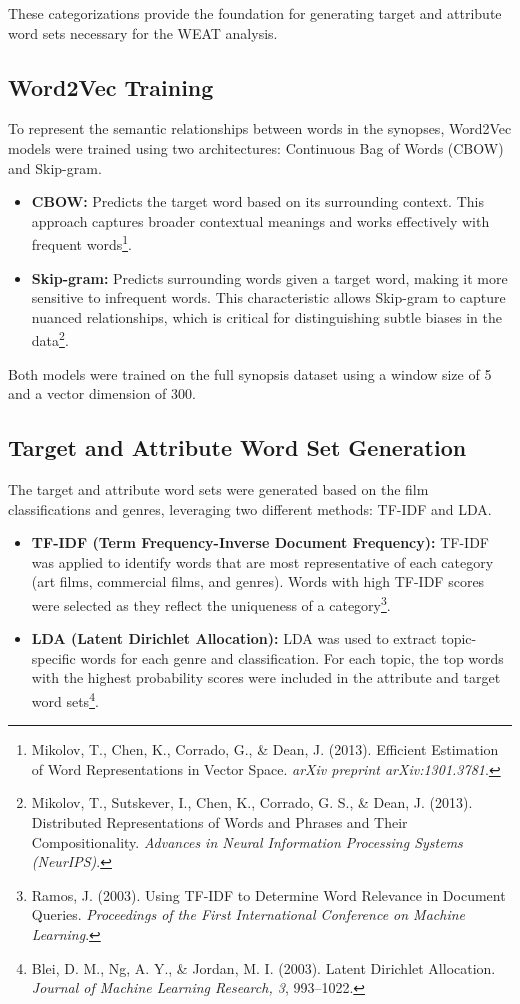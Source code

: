 \documentclass[conference]{IEEEtran}
\begin{document}
These categorizations provide the foundation for generating target and attribute word sets necessary for the WEAT analysis.

\subsection{Word2Vec Training}
To represent the semantic relationships between words in the synopses, Word2Vec models were trained using two architectures: Continuous Bag of Words (CBOW) and Skip-gram.

\begin{itemize}
    \item \textbf{CBOW:} Predicts the target word based on its surrounding context. This approach captures broader contextual meanings and works effectively with frequent words\footnote{Mikolov, T., Chen, K., Corrado, G., \& Dean, J. (2013). Efficient Estimation of Word Representations in Vector Space. \textit{arXiv preprint arXiv:1301.3781}.}.
    \item \textbf{Skip-gram:} Predicts surrounding words given a target word, making it more sensitive to infrequent words. This characteristic allows Skip-gram to capture nuanced relationships, which is critical for distinguishing subtle biases in the data\footnote{Mikolov, T., Sutskever, I., Chen, K., Corrado, G. S., \& Dean, J. (2013). Distributed Representations of Words and Phrases and Their Compositionality. \textit{Advances in Neural Information Processing Systems (NeurIPS)}.}.
\end{itemize}

Both models were trained on the full synopsis dataset using a window size of 5 and a vector dimension of 300.

\subsection{Target and Attribute Word Set Generation}
The target and attribute word sets were generated based on the film classifications and genres, leveraging two different methods: TF-IDF and LDA.

\begin{itemize}
    \item \textbf{TF-IDF (Term Frequency-Inverse Document Frequency):} TF-IDF was applied to identify words that are most representative of each category (art films, commercial films, and genres). Words with high TF-IDF scores were selected as they reflect the uniqueness of a category\footnote{Ramos, J. (2003). Using TF-IDF to Determine Word Relevance in Document Queries. \textit{Proceedings of the First International Conference on Machine Learning}.}.
    \item \textbf{LDA (Latent Dirichlet Allocation):} LDA was used to extract topic-specific words for each genre and classification. For each topic, the top words with the highest probability scores were included in the attribute and target word sets\footnote{Blei, D. M., Ng, A. Y., \& Jordan, M. I. (2003). Latent Dirichlet Allocation. \textit{Journal of Machine Learning Research, 3}, 993–1022.}.
\end{itemize}
\end{document}

